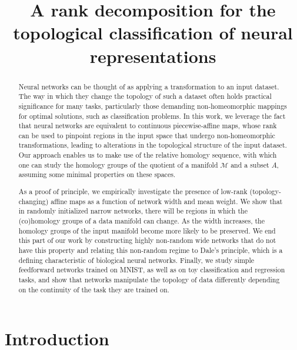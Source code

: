 
\title{A rank decomposition for the topological classification of neural representations}
\maketitle

\begin{abstract}
    Neural networks can be thought of as applying a transformation to an input dataset. The way in which they change the topology of such a dataset often holds practical significance for many tasks, particularly those demanding non-homeomorphic mappings for optimal solutions, such as classification problems. In this work, we leverage the fact that neural networks are equivalent to continuous piecewise-affine maps, whose rank can be used to pinpoint regions in the input space that undergo non-homeomorphic transformations, leading to alterations in the topological structure of the input dataset. Our approach enables us to make use of the relative homology sequence, with which one can study the homology groups of the quotient of a manifold $\mathcal{M}$ and a subset $A$, assuming some minimal properties on these spaces. 
    
    As a proof of principle, we empirically investigate the presence of low-rank (topology-changing) affine maps as a function of network width and mean weight. We show that in randomly initialized narrow networks, there will be regions in which the (co)homology groups of a data manifold can change. As the width increases, the homology groups of the input manifold become more likely to be preserved. We end this part of our work by constructing highly non-random wide networks that do not have this property and relating this non-random regime to Dale's principle, which is a defining characteristic of biological neural networks.
    Finally, we study simple feedforward networks trained on MNIST, as well as on toy classification and regression tasks, and show that networks manipulate the topology of data differently depending on the continuity of the task they are trained on.




\end{abstract}

\section{Introduction}

